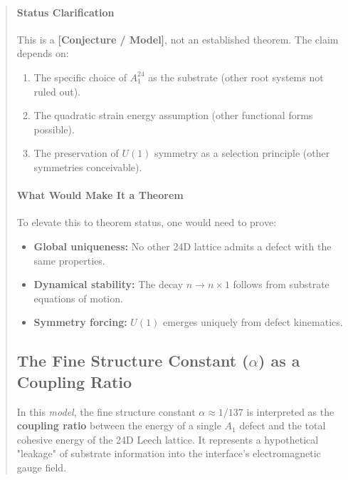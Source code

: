 \documentclass[11pt,titlepage]{article}
\begin{document}
\begin{abstract}
\paragraph{Status Clarification}
This is a \textbf{[Conjecture / Model]}, not an established theorem. The claim depends on:
\begin{enumerate}
\item The specific choice of $A_1^{24}$ as the substrate (other root systems not ruled out).
\item The quadratic strain energy assumption (other functional forms possible).
\item The preservation of $U(1)$ symmetry as a selection principle (other symmetries conceivable).
\end{enumerate}

\paragraph{What Would Make It a Theorem}
To elevate this to theorem status, one would need to prove:
\begin{itemize}
\item \textbf{Global uniqueness:} No other 24D lattice admits a defect with the same properties.
\item \textbf{Dynamical stability:} The decay $n \to n \times 1$ follows from substrate equations of motion.
\item \textbf{Symmetry forcing:} $U(1)$ emerges uniquely from defect kinematics.
\end{itemize}

\subsection{The Fine Structure Constant ($\alpha$) as a Coupling Ratio}
\begin{tcolorbox}[colback=yellow!5!white,colframe=yellow!75!black,title=Conjecture (Fine Structure Constant from Substrate Leakage)]
\label{conj:alpha-leakage}
In this \emph{model}, the fine structure constant $\alpha \approx 1/137$ is interpreted as the \textbf{coupling ratio} between the energy of a single $A_1$ defect and the total cohesive energy of the 24D Leech lattice. It represents a hypothetical "leakage" of substrate information into the interface's electromagnetic gauge field.
\end{tcolorbox}


\end{abstract}
\end{document}
